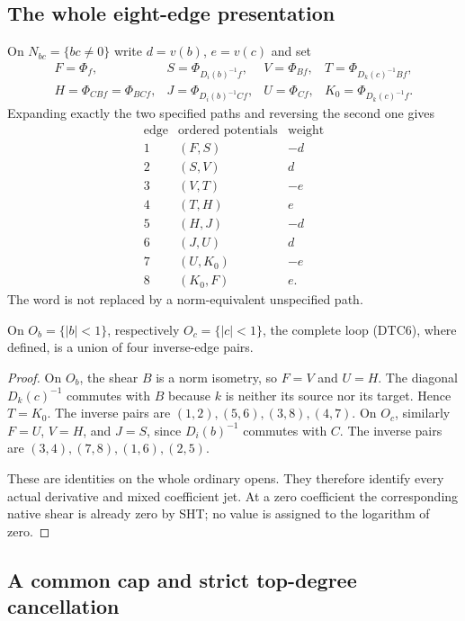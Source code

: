 \subsection{The whole eight-edge presentation}

On $N_{bc}=\{bc\ne0\}$ write $d=v(b)$, $e=v(c)$ and set
\[
 \begin{array}{llll}
 F=\Phi_f,&S=\Phi_{D_i(b)^{-1}f},&V=\Phi_{Bf},
   &T=\Phi_{D_k(c)^{-1}Bf},\\
 H=\Phi_{CBf}=\Phi_{BCf},&J=\Phi_{D_i(b)^{-1}Cf},
   &U=\Phi_{Cf},&K_0=\Phi_{D_k(c)^{-1}f}.
 \end{array}
 \tag{DTC5}
\]
Expanding exactly the two specified paths and reversing the second
one gives
\[
\begin{array}{c|c|c}
 \text{edge}&\text{ordered potentials}&\text{weight}\\\hline
 1&(F,S)&-d\\
 2&(S,V)&d\\
 3&(V,T)&-e\\
 4&(T,H)&e\\
 5&(H,J)&-d\\
 6&(J,U)&d\\
 7&(U,K_0)&-e\\
 8&(K_0,F)&e.
\end{array}
\tag{DTC6}
\]
The word is not replaced by a norm-equivalent unspecified path.

\begin{lemma}
On $O_b=\{|b|<1\}$, respectively $O_c=\{|c|<1\}$, the complete
loop (DTC6), where defined, is a union of four inverse-edge pairs.
\end{lemma}

\begin{proof}
On $O_b$, the shear $B$ is a norm isometry, so $F=V$ and $U=H$.
The diagonal $D_k(c)^{-1}$ commutes with $B$ because $k$ is neither
its source nor its target.  Hence $T=K_0$.  The inverse pairs are
$(1,2),(5,6),(3,8),(4,7)$.  On $O_c$, similarly $F=U$, $V=H$,
and $J=S$, since $D_i(b)^{-1}$ commutes with $C$.  The inverse
pairs are $(3,4),(7,8),(1,6),(2,5)$.

These are identities on the whole ordinary opens.  They therefore
identify every actual derivative and mixed coefficient jet.  At a
zero coefficient the corresponding native shear is already zero by
SHT; no value is assigned to the logarithm of zero.
\end{proof}

\subsection{A common cap and strict top-degree cancellation}

